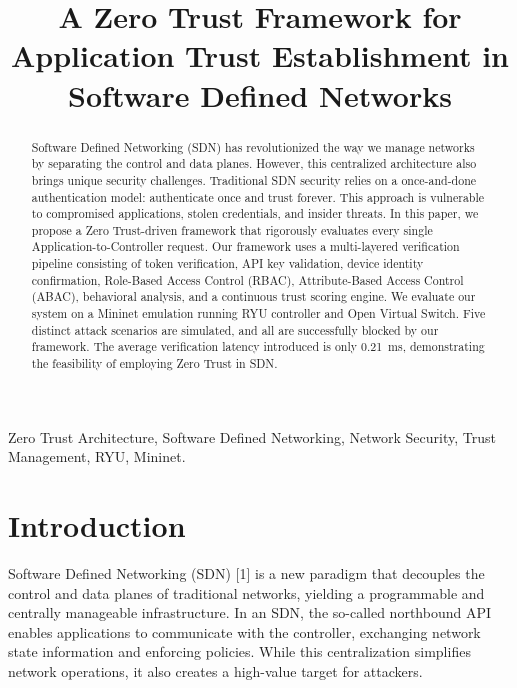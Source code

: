 \documentclass[conference]{IEEEtran}
\begin{document}
\title{A Zero Trust Framework for Application Trust Establishment in Software Defined Networks}

\author{
}

\maketitle

\begin{abstract}
Software Defined Networking (SDN) has revolutionized the way we manage networks by separating the control and data planes. However, this centralized architecture also brings unique security challenges. Traditional SDN security relies on a once-and-done authentication model: authenticate once and trust forever. This approach is vulnerable to compromised applications, stolen credentials, and insider threats. In this paper, we propose a Zero Trust-driven framework that rigorously evaluates every single Application-to-Controller request. Our framework uses a multi-layered verification pipeline consisting of token verification, API key validation, device identity confirmation, Role-Based Access Control (RBAC), Attribute-Based Access Control (ABAC), behavioral analysis, and a continuous trust scoring engine. We evaluate our system on a Mininet emulation running RYU controller and Open Virtual Switch. Five distinct attack scenarios are simulated, and all are successfully blocked by our framework. The average verification latency introduced is only 0.21~ms, demonstrating the feasibility of employing Zero Trust in SDN.
\end{abstract}

\begin{IEEEkeywords}
Zero Trust Architecture, Software Defined Networking, Network Security, Trust Management, RYU, Mininet.
\end{IEEEkeywords}

\section{Introduction}

Software Defined Networking (SDN) [1] is a new paradigm that decouples the control and data planes of traditional networks, yielding a programmable and centrally manageable infrastructure. In an SDN, the so-called northbound API enables applications to communicate with the controller, exchanging network state information and enforcing policies. While this centralization simplifies network operations, it also creates a high-value target for attackers.
\end{document}
